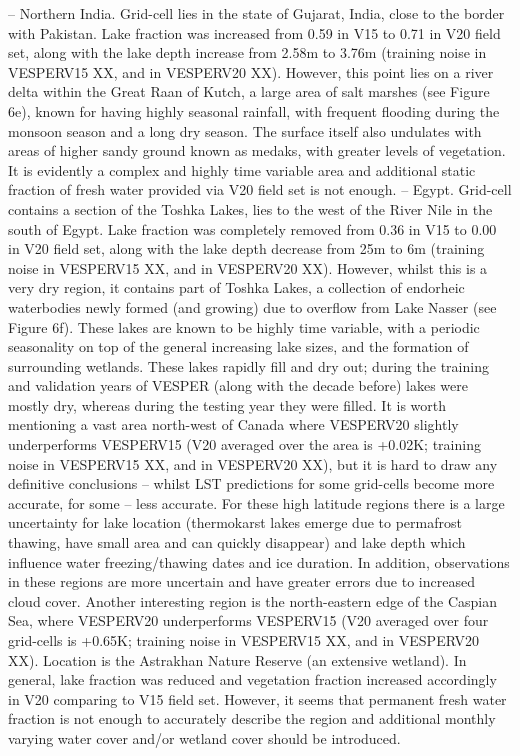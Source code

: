 \documentclass[hess, manuscript]{copernicus}
\begin{document}
– Northern India. Grid-cell lies in the state of Gujarat, India, close to the border with Pakistan. Lake fraction was increased from 0.59 in V15 to 0.71 in V20 field set, along with the lake depth increase from 2.58m to 3.76m (training noise in VESPERV15 XX, and in VESPERV20 XX). However, this point lies on a river delta within the Great Raan of Kutch, a large area of salt marshes (see Figure 6e), known for having highly seasonal rainfall, with frequent flooding during the monsoon season and a long dry season. The surface itself also undulates with areas of higher sandy ground known as medaks, with greater levels of vegetation. It is evidently a complex and highly time variable area and additional static fraction of fresh water provided via V20 field set is not enough.
– Egypt. Grid-cell contains a section of the Toshka Lakes, lies to the west of the River Nile in the south of Egypt. Lake fraction was completely removed from 0.36 in V15 to 0.00 in V20 field set, along with the lake depth decrease from 25m to 6m (training noise in VESPERV15 XX, and in VESPERV20 XX). However, whilst this is a very dry region, it contains part of Toshka Lakes, a collection of endorheic waterbodies newly formed (and growing) due to overflow from Lake Nasser (see Figure 6f). These lakes are known to be highly time variable, with a periodic seasonality on top of the general increasing lake sizes, and the formation of surrounding wetlands. These lakes rapidly fill and dry out; during the training and validation years of VESPER (along with the decade before) lakes were mostly dry, whereas during the testing year they were filled.
It is worth mentioning a vast area north-west of Canada where VESPERV20 slightly underperforms VESPERV15 (V20 averaged over the area is +0.02K; training noise in VESPERV15 XX, and in VESPERV20 XX), but it is hard to draw any definitive conclusions – whilst LST predictions for some grid-cells become more accurate, for some – less accurate. For these high latitude regions there is a large uncertainty for lake location (thermokarst lakes emerge due to permafrost thawing, have small area and can quickly disappear) and lake depth which influence water freezing/thawing dates and ice duration. In addition, observations in these regions are more uncertain and have greater errors due to increased cloud cover. Another interesting region is the north-eastern edge of the Caspian Sea, where VESPERV20 underperforms VESPERV15 (V20 averaged over four grid-cells is +0.65K; training noise in VESPERV15 XX, and in VESPERV20 XX). Location is the Astrakhan Nature Reserve (an extensive wetland). In general, lake fraction was reduced and vegetation fraction increased accordingly in V20 comparing to V15 field set. However, it seems that permanent fresh water fraction is not enough to accurately describe the region and additional monthly varying water cover and/or wetland cover should be introduced.
\end{document}
